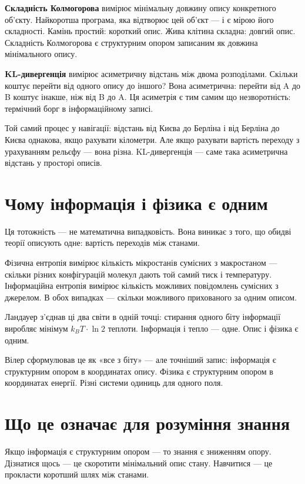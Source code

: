 \documentclass[12pt, a4paper, openany]{book}
\begin{document}
\textbf{Складність Колмогорова} вимірює мінімальну довжину опису конкретного об'єкту. Найкоротша програма, яка відтворює цей об'єкт — і є мірою його складності. Камінь простий: короткий опис. Жива клітина складна: довгий опис. Складність Колмогорова є структурним опором записаним як довжина мінімального опису.

\textbf{KL-дивергенція} вимірює асиметричну відстань між двома розподілами. Скільки коштує перейти від одного опису до іншого? Вона асиметрична: перейти від A до B коштує інакше, ніж від B до A. Ця асиметрія є тим самим що незворотність: термічний борг в інформаційному записі.

\begin{analogybox}
Той самий процес у навігації: відстань від Києва до Берліна і від Берліна до Києва однакова, якщо рахувати кілометри. Але якщо рахувати вартість переходу з урахуванням рельєфу — вона різна. KL-дивергенція — саме така асиметрична відстань у просторі описів.
\end{analogybox}

\section{Чому інформація і фізика є одним}

Ця тотожність — не математична випадковість. Вона виникає з того, що обидві теорії описують одне: вартість переходів між станами.

Фізична ентропія вимірює кількість мікростанів сумісних з макростаном — скільки різних конфігурацій молекул дають той самий тиск і температуру. Інформаційна ентропія вимірює кількість можливих повідомлень сумісних з джерелом. В обох випадках — скільки можливого прихованого за одним описом.

Ландауер з'єднав ці два світи в одній точці: стирання одного біту інформації виробляє мінімум $k_B T \cdot \ln 2$ теплоти. Інформація і тепло — одне. Опис і фізика є одним.

Вілер сформулював це як «все з біту» — але точніший запис: інформація є структурним опором в координатах опису. Фізика є структурним опором в координатах енергії. Різні системи одиниць для одного поля.

\section{Що це означає для розуміння знання}

Якщо інформація є структурним опором — то знання є зниженням опору. Дізнатися щось — це скоротити мінімальний опис стану. Навчитися — це прокласти коротший шлях між станами.
\end{document}
